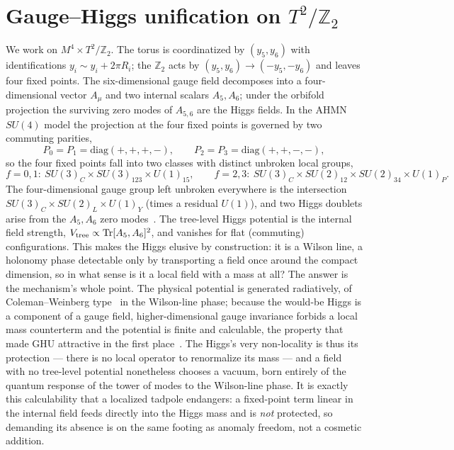 \documentclass[11pt,a4paper]{article}
\newcommand{\Tr}{\mathrm{Tr}}
\begin{document}
\section{Gauge--Higgs unification on \texorpdfstring{$T^2/\mathbb{Z}_2$}{T2/Z2}}\label{sec:orbifold}
We work on $M^4\times T^2/\mathbb{Z}_2$. The torus is coordinatized by
$(y_5,y_6)$ with identifications $y_i\sim y_i+2\pi R_i$; the $\mathbb{Z}_2$ acts by
$(y_5,y_6)\to(-y_5,-y_6)$ and leaves four fixed points. The six-dimensional gauge field
decomposes into a four-dimensional vector $A_\mu$ and two internal scalars $A_5,A_6$;
under the orbifold projection the surviving zero modes of $A_{5,6}$ are the Higgs
fields. In the AHMN $SU(4)$ model the projection at the four fixed points is governed
by two commuting parities,
\begin{equation}
P_0=P_1=\mathrm{diag}(+,+,+,-),\qquad P_2=P_3=\mathrm{diag}(+,+,-,-),
\end{equation}
so the four fixed points fall into two classes with distinct unbroken local groups,
\begin{equation}
f=0,1:\ SU(3)_C\times SU(3)_{123}\times U(1)_{15},\qquad
f=2,3:\ SU(3)_C\times SU(2)_{12}\times SU(2)_{34}\times U(1)_P .
\end{equation}
The four-dimensional gauge group left unbroken everywhere is the intersection
$SU(3)_C\times SU(2)_L\times U(1)_Y$ (times a residual $U(1)$), and two Higgs doublets
arise from the $A_5,A_6$ zero modes~\cite{AHMN}. The tree-level Higgs potential is the
internal field strength, $V_{\rm tree}\propto \Tr[A_5,A_6]^2$, and vanishes for flat
(commuting) configurations. This makes the Higgs elusive by construction: it is a
Wilson line, a holonomy phase detectable only by transporting a field once around the
compact dimension, so in what sense is it a local field with a mass at all? The answer
is the mechanism's whole point. The physical potential is generated radiatively, of
Coleman--Weinberg type~\cite{ColemanWeinberg} in the Wilson-line phase; because the
would-be Higgs is a component of a gauge field, higher-dimensional gauge invariance
forbids a local mass counterterm and the potential is finite and calculable, the
property that made GHU attractive in the first place~\cite{Hosotani}. The Higgs's very
non-locality is thus its protection --- there is no local operator to renormalize its
mass --- and a field with no tree-level potential nonetheless chooses a vacuum, born
entirely of the quantum response of the tower of modes to the Wilson-line phase. It is exactly this
calculability that a localized tadpole endangers: a fixed-point term linear in the
internal field feeds directly into the Higgs mass and is \emph{not} protected, so
demanding its absence is on the same footing as anomaly freedom, not a cosmetic
addition.
\end{document}

